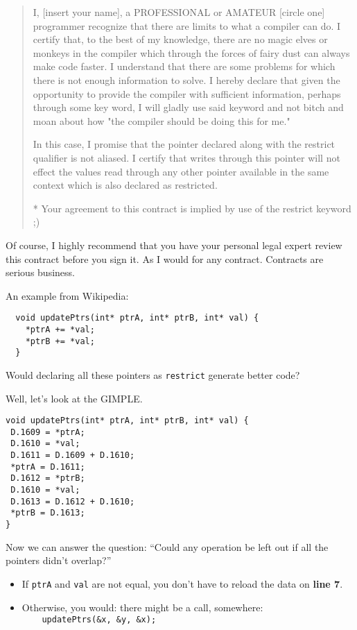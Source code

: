 \begin{quote}
I, [insert your name], a PROFESSIONAL or AMATEUR [circle one] programmer recognize that there are limits to what a compiler can do. I certify that, to the best of my knowledge, there are no magic elves or monkeys in the compiler which through the forces of fairy dust can always make code faster. I understand that there are some problems for which there is not enough information to solve. I hereby declare that given the opportunity to provide the compiler with sufficient information, perhaps through some key word, I will gladly use said keyword and not bitch and moan about how "the compiler should be doing this for me."

In this case, I promise that the pointer declared along with the restrict qualifier is not aliased. I certify that writes through this pointer will not effect the values read through any other pointer available in the same context which is also declared as restricted.

* Your agreement to this contract is implied by use of the restrict keyword ;)
\end{quote}

Of course, I highly recommend that you have your personal legal expert review this contract before you sign it. As I would for any contract. Contracts are serious business.

An example from Wikipedia:
\begin{verbatim}
  void updatePtrs(int* ptrA, int* ptrB, int* val) {
    *ptrA += *val;
    *ptrB += *val;
  }
\end{verbatim}
Would declaring all these pointers as {\tt restrict} generate better code?

Well, let's look at the GIMPLE.

\begin{verbatim}
void updatePtrs(int* ptrA, int* ptrB, int* val) {
 D.1609 = *ptrA;
 D.1610 = *val;
 D.1611 = D.1609 + D.1610;
 *ptrA = D.1611;
 D.1612 = *ptrB;
 D.1610 = *val;
 D.1613 = D.1612 + D.1610;
 *ptrB = D.1613;
}
\end{verbatim}

Now we can answer the question: ``Could any operation be left out if
all the pointers didn't overlap?''

\begin{itemize}
\item If {\tt ptrA} and {\tt val} are not equal, you don't have to
      reload the data on {\bf line 7}.
\item Otherwise, you would: there might be a call, somewhere:\\\verb+    updatePtrs(&x, &y, &x);+
\end{itemize}

